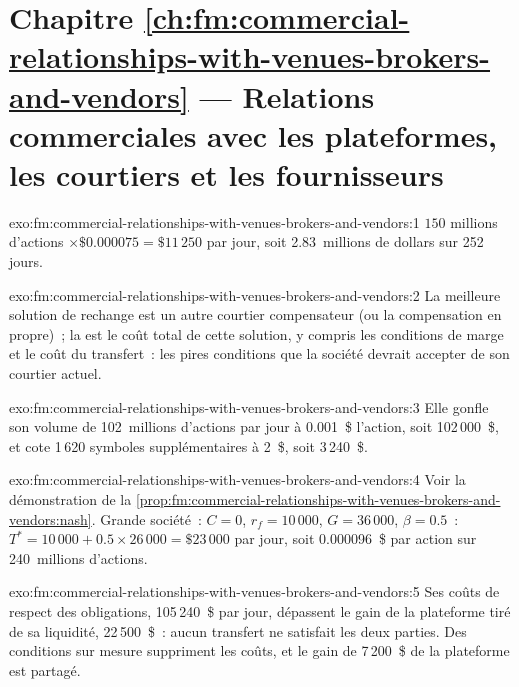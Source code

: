 \section*{Chapitre \ref{ch:fm:commercial-relationships-with-venues-brokers-and-vendors} --- Relations commerciales avec les plateformes, les courtiers et les fournisseurs}

\begin{solution}{exo:fm:commercial-relationships-with-venues-brokers-and-vendors:1}
$150$ millions d'actions $\times\$0.000075=\$11\,250$ par jour, soit 2.83~millions de dollars sur 252 jours.
\end{solution}

\begin{solution}{exo:fm:commercial-relationships-with-venues-brokers-and-vendors:2}
La meilleure solution de rechange est un autre courtier compensateur (ou la compensation en propre)~; la  est le coût total de cette solution, y compris
les conditions de marge et le coût du transfert~: les pires conditions que la société devrait accepter de son courtier actuel.
\end{solution}

\begin{solution}{exo:fm:commercial-relationships-with-venues-brokers-and-vendors:3}
Elle gonfle son volume de 102~millions d'actions par jour à 0.001~\$ l'action, soit 102\,000~\$, et cote 1\,620 symboles supplémentaires à 2~\$, soit 3\,240~\$.
\end{solution}

\begin{solution}{exo:fm:commercial-relationships-with-venues-brokers-and-vendors:4}
Voir la démonstration de la \cref{prop:fm:commercial-relationships-with-venues-brokers-and-vendors:nash}. Grande société~: $C=0$, $r_f=10\,000$, $G=36\,000$,
$\beta=0.5$~: $T^*=10\,000+0.5\times26\,000=\$23\,000$ par jour, soit 0.000096~\$ par action sur 240~millions d'actions.
\end{solution}

\begin{solution}{exo:fm:commercial-relationships-with-venues-brokers-and-vendors:5}
Ses coûts de respect des obligations, 105\,240~\$ par jour, dépassent le gain de la plateforme tiré de sa liquidité, 22\,500~\$~: aucun transfert ne satisfait les deux parties. Des
conditions sur mesure suppriment les coûts, et le gain de 7\,200~\$ de la plateforme est partagé.
\end{solution}

